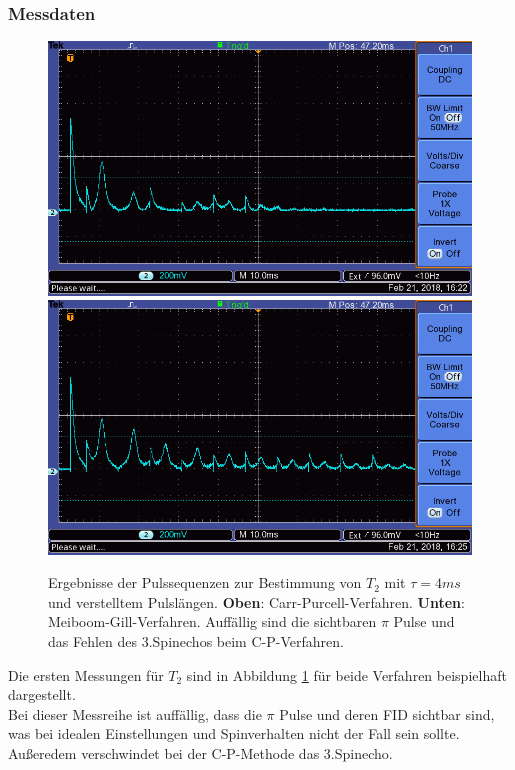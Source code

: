 \documentclass[12pt,a4paper]{article}
\begin{document}
\subsubsection{Messdaten}\label{sec:T2messdaten}
\begin{figure}
\centering
\includegraphics[scale=0.8]{Bilder/T2CP.png}
\includegraphics[scale=0.8]{Bilder/T2MG.png}
\caption{Ergebnisse der Pulssequenzen zur Bestimmung von $T_2$ mit $\tau = 4ms$ und verstelltem Pulslängen. \textbf{Oben}: Carr-Purcell-Verfahren. \textbf{Unten}: Meiboom-Gill-Verfahren. Auffällig sind die sichtbaren $\pi$ Pulse und das Fehlen des 3.Spinechos beim C-P-Verfahren.}
\label{fig:T2Daten}
\end{figure}

Die ersten Messungen für $T_2$ sind in Abbildung \ref{fig:T2Daten} für beide Verfahren beispielhaft dargestellt.\\
Bei dieser Messreihe ist auffällig, dass die $\pi$ Pulse und deren FID sichtbar sind, was bei idealen Einstellungen und Spinverhalten nicht der Fall sein sollte. Außeredem verschwindet bei der C-P-Methode das 3.Spinecho.
\end{document}
